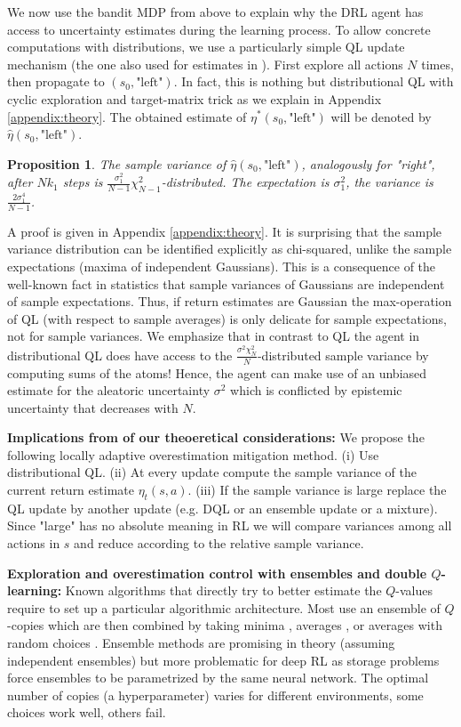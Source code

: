 \documentclass{article}
\theoremstyle{plain}
\newtheorem{proposition}[theorem]{Proposition}
\theoremstyle{definition}
\theoremstyle{remark}
\begin{document}
We now use the bandit MDP from above to explain why the DRL agent has access to uncertainty estimates during the learning process. To allow concrete computations with distributions, we use a particularly simple QL update mechanism (the one also used for estimates in \cite{VanHasselt:2011}). First explore all actions $N$ times, then propagate to $(s_0,\text{"left"})$. In fact, this is nothing but distributional QL with cyclic exploration and target-matrix trick \cite{dqn} as we explain in Appendix \ref{appendix:theory}. The obtained estimate of $\eta^*(s_0,\text{"left"})$ will be denoted by $\hat \eta(s_0,\text{"left"})$.
\begin{proposition}\label{prop3}
    The sample variance of $\hat \eta(s_0,\text{"left"})$, analogously for "right", after $Nk_1$ steps is $\frac{\sigma_1^2 }{N-1}\chi_{N-1}^2$-distributed. The expectation is $\sigma_1^2$, the variance is $\frac{2\sigma_1^4}{N-1}$.
\end{proposition}
A proof is given in Appendix \ref{appendix:theory}. It is surprising that the sample variance distribution can be identified explicitly as chi-squared, unlike the sample expectations (maxima of independent Gaussians). This is a consequence of the well-known fact in statistics that sample variances of Gaussians are independent of sample expectations. Thus, if return estimates are Gaussian the max-operation of QL (with respect to sample averages) is only delicate for sample expectations, not for sample variances. We emphasize that in contrast to QL the agent in distributional QL does have access to the $\frac{\sigma^2 \chi_{N}^2}{N}$-distributed sample variance by computing sums of the atoms! Hence, the agent can make use of an unbiased estimate for the aleatoric uncertainty $\sigma^2$ which is conflicted by epistemic uncertainty that decreases with $N$. 

\textbf{Implications from of our theoeretical considerations:} We propose the following locally adaptive overestimation mitigation method. (i) Use distributional QL. (ii) At every update compute the sample variance of the current return estimate $\eta_t(s,a)$. (iii) If the sample variance is large replace the QL update by another update (e.g. DQL or an ensemble update or a mixture). Since "large" has no absolute meaning in RL we will compare variances among all actions in $s$ and reduce according to the relative sample variance. 

\textbf{Exploration and overestimation control with ensembles and double $Q$-learning:} 
Known algorithms that directly try to better estimate the $Q$-values require to set up a particular algorithmic architecture. Most use an ensemble of $Q$-copies which are then combined by taking minima \cite{Maxmin}, averages \cite{EnsembleQ}, or averages with random choices \cite{redq}. Ensemble methods are promising in theory (assuming independent ensembles) but more problematic for deep RL as storage problems force ensembles to be parametrized by the same neural network. The optimal number of copies (a hyperparameter) varies for different environments, some choices work well, others fail. 
\end{document}
